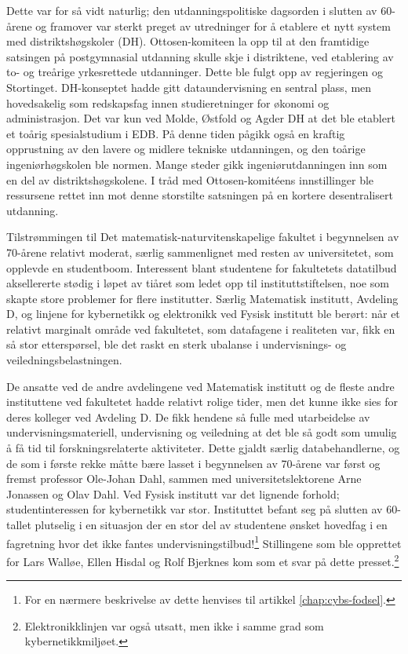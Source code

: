 Dette var for så vidt naturlig; den utdanningspolitiske dagsorden i slutten av 60-årene og framover var sterkt preget av utredninger for å etablere et nytt system med distriktshøgskoler (DH). Ottosen-komiteen la opp til at den framtidige satsingen på postgymnasial utdanning skulle skje i distriktene, ved etablering av to- og treårige yrkesrettede utdanninger. Dette ble fulgt opp av regjeringen og Stortinget. DH-konseptet hadde gitt dataundervisning en sentral plass, men hovedsakelig som redskapsfag innen studieretninger for økonomi og administrasjon. Det var kun ved Molde, Østfold og Agder DH at det ble etablert et toårig spesialstudium i EDB. På denne tiden pågikk også en kraftig opprustning av den lavere og midlere tekniske utdanningen, og den toårige ingeniørhøgskolen ble normen. Mange steder gikk ingeniørutdanningen inn som en del av distriktshøgskolene. I tråd med Ottosen-komitéens innstillinger ble ressursene rettet inn mot denne storstilte satsningen på en kortere desentralisert utdanning.

Tilstrømmingen til Det matematisk-naturvitenskapelige fakultet i begynnelsen av 70-årene relativt moderat, særlig sammenlignet med resten av universitetet, som opplevde en studentboom. Interessent blant studentene for fakultetets datatilbud aksellererte stødig i løpet av tiåret som ledet opp til instituttstiftelsen, noe som skapte store problemer for flere institutter. Særlig Matematisk institutt, Avdeling D, og linjene for kybernetikk og elektronikk ved Fysisk institutt ble berørt: når et relativt marginalt område ved fakultetet, som datafagene i realiteten var, fikk en så stor etterspørsel, ble det raskt en sterk ubalanse i undervisnings- og veiledningsbelastningen. 

De ansatte ved de andre avdelingene ved Matematisk institutt og de fleste andre instituttene ved fakultetet hadde relativt rolige tider, men det kunne ikke sies for deres kolleger ved Avdeling D. De fikk hendene så fulle med utarbeidelse av undervisningsmateriell, undervisning og veiledning at det ble så godt som umulig å få tid til forskningsrelaterte aktiviteter. Dette gjaldt særlig databehandlerne, og de som i første rekke måtte bære lasset i begynnelsen av 70-årene var først og fremst professor Ole-Johan Dahl, sammen med universitetslektorene Arne Jonassen og Olav Dahl. Ved Fysisk institutt var det lignende forhold; studentinteressen for kybernetikk var stor. Instituttet befant seg på slutten av 60-tallet plutselig i en situasjon der en stor del av studentene ønsket hovedfag i en fagretning hvor det ikke fantes undervisningstilbud!\footnote{For en nærmere beskrivelse av dette henvises til artikkel \ref{chap:cybs-fodsel}.} Stillingene som ble opprettet for Lars Walløe, Ellen Hisdal og Rolf Bjerknes kom som et svar på dette presset.\footnote{Elektronikklinjen  var  også  utsatt,  men  ikke  i  samme  grad  som  kybernetikkmiljøet.} 

